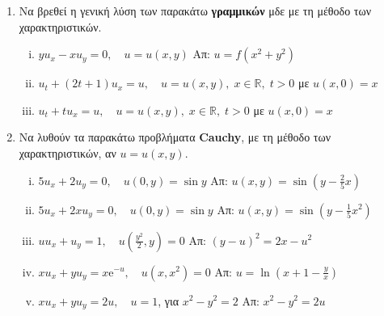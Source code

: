 \documentclass[a4paper,table]{report}
\begin{document}
\begin{center}
  \minibox{\large\bfseries \textcolor{Col1}{ΜΔΕ 1ης τάξης}}
\end{center}

\vspace{\baselineskip}

\begin{enumerate}

  \item Να βρεθεί η γενική λύση των παρακάτω \textbf{γραμμικών} μδε με τη μέθοδο των
    χαρακτηριστικών.

    \begin{enumerate}[i)]
      \item $yu_{x}-xu_{y}=0, \quad u=u(x,y)$ \hfill Απ: $u=f(x^{2}+y^{2})$ 
      \item $ u_{t}+(2t+1)u_{x}=u , \quad u=u(x,y), \; x \in \mathbb{R}, \; t>0$ 
        με $ u(x,0)=x $
      \item $ u_{t}+tu_{x}=u , \quad u=u(x,y), \; x \in \mathbb{R}, \; t>0$ 
        με $ u(x,0)=x $
    \end{enumerate}

    \item Να λυθούν τα παρακάτω προβλήματα \textbf{Cauchy}, με τη μέθοδο των
        χαρακτηριστικών,  αν $u=u(x,y)$.

        \begin{enumerate}[i)]
          \item $5u_{x}+2u_{y}=0, \quad u(0,y)=\sin y$ 
            \hfill Απ: $u(x,y)=\sin(y-\frac{2}{5}x)$
          \item $5u_{x}+2xu_{y}=0, \quad u(0,y)=\sin y$ 
            \hfill Απ: $u(x,y)=\sin(y-\frac{1}{5}x^{2})$ 
          \item $uu_{x}+u_{y}=1, \quad u(\frac{y^{2}}{2},y)=0$ 
            \hfill Απ: $(y-u)^{2}=2x-u^{2}$
          \item $ xu_{x}+yu_{y}=x \mathrm{e}^{-u}, \quad  u(x,x^{2})=0 $
            \hfill Απ: $ u= \ln{(x+1 - \frac{y}{x})} $ 
          \item $xu_{x}+yu_{y}=2u,\quad u=1$, για $x^{2}-y^{2}=2$ 
            \hfill Απ: $x^{2}-y^{2}=2u$
        \end{enumerate}
    \end{enumerate}
\end{document}
